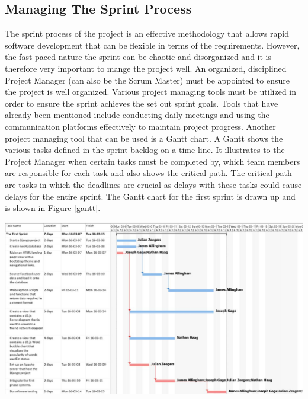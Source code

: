 \documentclass[12pt,onecolumn]{article}
\begin{document}
	\subsection{Managing The Sprint Process}
	The sprint process of the project is an effective methodology that allows rapid software development that can be flexible in terms of the requirements. However, the fast paced nature the sprint can be chaotic and disorganized and it is therefore very important to mange the project well. An organized, disciplined Project Manager (can also be the Scrum Master) must be appointed to ensure the project is well organized. Various project managing tools must be utilized in order to ensure the sprint achieves the set out sprint goals. Tools that have already been mentioned include conducting daily meetings and using the communication platforms effectively to maintain project progress. Another project managing tool that can be used is a Gantt chart. A Gantt shows the various tasks defined in the sprint backlog on a time-line. It illustrates to the Project Manager when certain tasks must be completed by, which team members are responsible for each task and also shows the critical path. The critical path are tasks in which the deadlines are crucial as delays with these tasks could cause delays for the entire sprint. The Gantt chart for the first sprint is drawn up and is shown in Figure \ref{gantt}.
	
	
	\begin{center}
		\includegraphics[width=\textwidth]{gantt}
		 \label{fig:gantt}
	\end{center}
	
\end{document}
